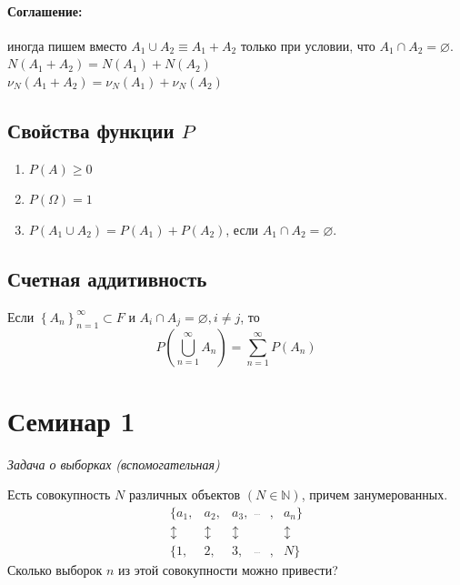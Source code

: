 \documentclass[a4paper, 12pt]{article}
\theoremstyle{definition}
\begin{document}
\begin{enumerate}
		\paragraph{Соглашение:} иногда пишем вместо $A_1\cup A_2\equiv A_1+A_2$ только при условии, что $A_1\cap A_2=\varnothing$.\\
		$N(A_1+A_2)=N(A_1)+N(A_2)$\\
		$\nu_N(A_1+A_2)=\nu_N(A_1)+\nu_N(A_2)$\\
		\subsection{Свойства функции $P$}
		\begin{enumerate}
		\item $P(A)\ge 0$
		\item $P(\Omega)=1$
		\item $P\left(A_1\cup A_2\right)=P(A_1)+P(A_2)$, если $A_1\cap A_2=\varnothing$.
		\end{enumerate}
		\subsection{Счетная аддитивность}
		Если $\left\{A_n\right\}^\infty_{n=1}\subset F$ и $A_i\cap A_j=\varnothing, i\ne j$, то 
		\begin{equation}
			P\left(\bigcup^\infty_{n=1}A_n\right)=\sum_{n=1}^\infty P\left(A_n\right)
		\end{equation}
	\end{enumerate}
	\section{Семинар 1}
	\textit{Задача о выборках (вспомогательная)}\par
	Есть совокупность $N$ различных объектов $\left(N\in\mathbb{N}\right)$, причем занумерованных.
	\begin{equation*}
		\begin{matrix}
		\{a_1, & a_2, & a_3, & \dddot{} &, & a_n\} \\
		\updownarrow & \updownarrow & \updownarrow && &\updownarrow\\
		\{1, & 2, & 3, & \dddot{} &, & N\}
		\end{matrix}
	\end{equation*}
	Сколько выборок $n$ из этой совокупности можно привести?
\end{document}
